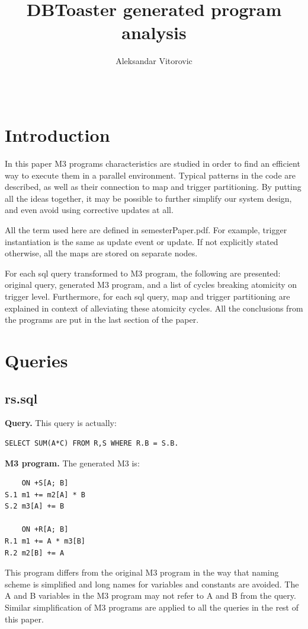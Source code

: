 \documentclass{sig-semester}
\title{DBToaster generated program analysis}
\author{\alignauthor Aleksandar Vitorovic \\[1ex]
\affaddr{Dept.\ of Computer Science} \\
\affaddr{EPFL} \\
\affaddr{aleksandar.vitorovic@epfl.ch}
}
\begin{document}
\maketitle



\section{Introduction}
\vspace{2mm}
In this paper M3 programs characteristics are studied in order to find an efficient way to execute them in a parallel environment. Typical patterns in the code are described, as well as their connection to map and trigger partitioning. By putting all the ideas together, it may be possible to further simplify our system design, and even avoid using corrective updates at all.

All the term used here are defined in semesterPaper.pdf. For example, trigger instantiation is the same as update event or update. If not explicitly stated otherwise, all the maps are stored on separate nodes.

For each sql query transformed to M3 program, the following are presented: original query, generated M3 program, and a list of cycles breaking atomicity on trigger level. Furthermore, for each sql query, map and trigger partitioning are explained in context of alleviating these atomicity cycles. All the conclusions from the programs are put in the last section of the paper.

\section{Queries}
\vspace{2mm}

\subsection{rs.sql}
\textbf{Query.} This query is actually:
\begin{verbatim}
SELECT SUM(A*C) FROM R,S WHERE R.B = S.B.
\end{verbatim}

\textbf{M3 program.} The generated M3 is:
\begin{verbatim}
    ON +S[A; B] 
S.1 m1 += m2[A] * B
S.2 m3[A] += B

    ON +R[A; B] 
R.1 m1 += A * m3[B]
R.2 m2[B] += A
\end{verbatim}
This program differs from the original M3 program in the way that naming scheme is simplified and long names for variables and constants are avoided. The A and B variables in the M3 program may not refer to A and B from the query. Similar simplification of M3 programs are applied to all the queries in the rest of this paper.
\end{document}
